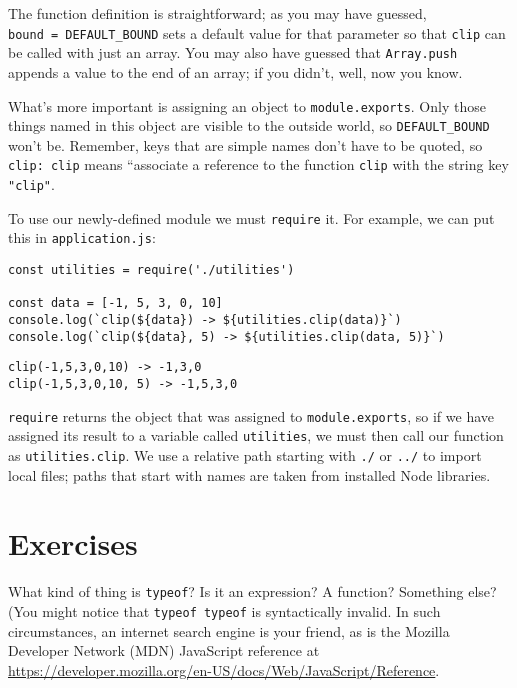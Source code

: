 The function definition is straightforward;
as you may have guessed, \texttt{bound\ =\ DEFAULT\_BOUND} sets a default value for that parameter
so that \texttt{clip} can be called with just an array.
You may also have guessed that \texttt{Array.push} appends a value to the end of an array;
if you didn't,
well,
now you know.

What's more important is assigning an object to \texttt{module.exports}.
Only those things named in this object are visible to the outside world,
so \texttt{DEFAULT\_BOUND} won't be.
Remember,
keys that are simple names don't have to be quoted,
so \texttt{clip:\ clip} means ``associate a reference to the function \texttt{clip} with the string key \texttt{"clip"}.

To use our newly-defined module we must \texttt{require} it.
For example,
we can put this in \texttt{application.js}:

\begin{verbatim}
const utilities = require('./utilities')

const data = [-1, 5, 3, 0, 10]
console.log(`clip(${data}) -> ${utilities.clip(data)}`)
console.log(`clip(${data}, 5) -> ${utilities.clip(data, 5)}`)
\end{verbatim}

\begin{verbatim}
clip(-1,5,3,0,10) -> -1,3,0
clip(-1,5,3,0,10, 5) -> -1,5,3,0
\end{verbatim}

\noindent
\texttt{require} returns the object that was assigned to \texttt{module.exports},
so if we have assigned its result to a variable called \texttt{utilities},
we must then call our function as \texttt{utilities.clip}.
We use a relative path starting with \texttt{./} or \texttt{../} to import local files;
paths that start with names are taken from installed Node libraries.


\section{Exercises}\label{s:basics-exercises}


What kind of thing is \texttt{typeof}?
Is it an expression?
A function?
Something else?
(You might notice that \texttt{typeof\ typeof} is syntactically invalid.
In such circumstances,
an internet search engine is your friend,
as is the Mozilla Developer Network (MDN) JavaScript reference
at \url{https://developer.mozilla.org/en-US/docs/Web/JavaScript/Reference}.

